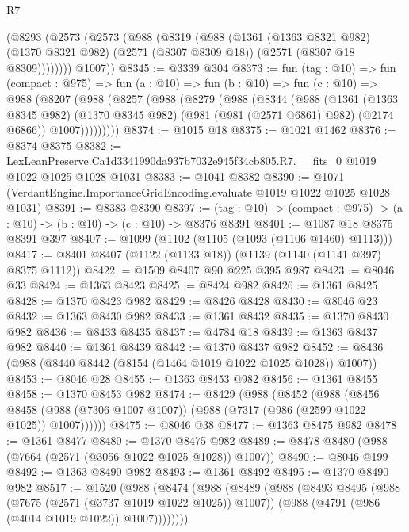 \begin{lexlean}{R7}
\begin{coremodule}
      (@8293
        (@2573
          (@2573
            (@988
              (@8319
                (@988
                  (@1361
                    (@1363 @8321 @982)
                    (@1370 @8321 @982)
                    (@2571 (@8307 @8309 @18))
                    (@2571 (@8307 @18 @8309))))))))
        @1007))
@8345 := @3339 @304
@8373 := fun (tag : @10) =>
  fun (compact : @975) =>
  fun (a : @10) =>
  fun (b : @10) =>
  fun (c : @10) =>
  @988
    (@8207
      (@988
        (@8257
          (@988
            (@8279
              (@988
                (@8344
                  (@988
                    (@1361
                      (@1363 @8345 @982)
                      (@1370 @8345 @982)
                      (@981 (@981 (@2571 @6861) @982) (@2174 @6866))
                      @1007)))))))))
@8374 := @1015 @18
@8375 := @1021 @1462
@8376 := @8374 @8375
@8382 := LexLeanPreserve.Ca1d3341990da937b7032e945f34cb805.R7.__fits_0 @1019 @1022 @1025 @1028 @1031
@8383 := @1041 @8382
@8390 := @1071 (VerdantEngine.ImportanceGridEncoding.evaluate @1019 @1022 @1025 @1028 @1031)
@8391 := @8383 @8390
@8397 := (tag : @10) -> (compact : @975) -> (a : @10) -> (b : @10) -> (c : @10) -> @8376 @8391
@8401 := @1087 @18 @8375 @8391 @397
@8407 := @1099 (@1102 (@1105 (@1093 (@1106 @1460) @1113)))
@8417 := @8401 @8407 (@1122 (@1133 @18)) (@1139 (@1140 (@1141 @397) @8375 @1112))
@8422 := @1509 @8407 @90 @225 @395 @987
@8423 := @8046 @33
@8424 := @1363 @8423
@8425 := @8424 @982
@8426 := @1361 @8425
@8428 := @1370 @8423 @982
@8429 := @8426 @8428
@8430 := @8046 @23
@8432 := @1363 @8430 @982
@8433 := @1361 @8432
@8435 := @1370 @8430 @982
@8436 := @8433 @8435
@8437 := @4784 @18
@8439 := @1363 @8437 @982
@8440 := @1361 @8439
@8442 := @1370 @8437 @982
@8452 := @8436 (@988 (@8440 @8442 (@8154 (@1464 @1019 @1022 @1025 @1028)) @1007))
@8453 := @8046 @28
@8455 := @1363 @8453 @982
@8456 := @1361 @8455
@8458 := @1370 @8453 @982
@8474 := @8429
    (@988
      (@8452
        (@988
          (@8456
            @8458
            (@988 (@7306 @1007 @1007))
            (@988 (@7317 (@986 (@2599 @1022 @1025)) @1007))))))
@8475 := @8046 @38
@8477 := @1363 @8475 @982
@8478 := @1361 @8477
@8480 := @1370 @8475 @982
@8489 := @8478 @8480 (@988 (@7664 (@2571 (@3056 @1022 @1025 @1028)) @1007))
@8490 := @8046 @199
@8492 := @1363 @8490 @982
@8493 := @1361 @8492
@8495 := @1370 @8490 @982
@8517 := @1520
    (@988
      (@8474
        (@988
          (@8489
            (@988
              (@8493
                @8495
                (@988 (@7675 (@2571 (@3737 @1019 @1022 @1025)) @1007))
                (@988 (@4791 (@986 (@4014 @1019 @1022)) @1007))))))))

\end{coremodule}
\end{lexlean}
